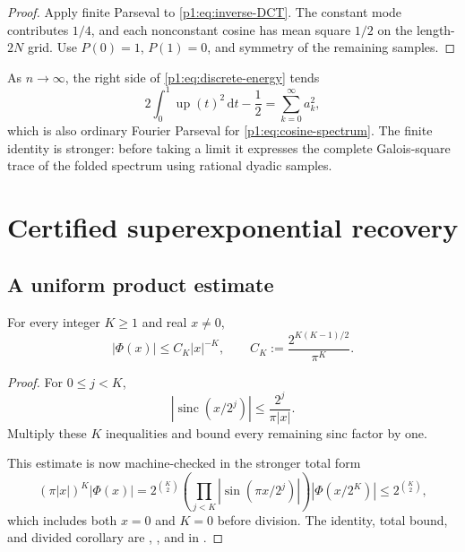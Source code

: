 \documentclass[11pt,oneside]{article}
\theoremstyle{definition}
\theoremstyle{remark}
\newcommand{\Up}{\operatorname{up}}
\newcommand{\sinc}{\operatorname{sinc}}
\newcommand{\dd}{\,\mathrm d}
\newcommand{\PhiU}{\Phi}
\begin{document}
\begin{proof}
Apply finite Parseval to \eqref{p1:eq:inverse-DCT}.  The constant mode contributes
$1/4$, and each nonconstant cosine has mean square $1/2$ on the length-$2N$
grid.  Use $P(0)=1$, $P(1)=0$, and symmetry of the remaining samples.
\end{proof}

\begin{remark}
As $n\to\infty$, the right side of \eqref{p1:eq:discrete-energy} tends
\[
 2\int_0^1\Up(t)^2\dd t-\frac12
 =\sum_{k=0}^{\infty}a_k^2,
\]
which is also ordinary Fourier Parseval for \eqref{p1:eq:cosine-spectrum}.  The
finite identity is stronger: before taking a limit it expresses the complete
Galois-square trace of the folded spectrum using rational dyadic samples.
\end{remark}

\section{Certified superexponential recovery}\label{p1:sec:alias-error}

\subsection{A uniform product estimate}

\begin{lemma}\label{p1:lem:selected-factor-bound}
For every integer $K\ge1$ and real $x\ne0$,
\begin{equation}\label{p1:eq:selected-factor-bound}
 |\PhiU(x)|\le C_K|x|^{-K},
 \qquad
 C_K:=\frac{2^{K(K-1)/2}}{\pi^K}.
\end{equation}
\end{lemma}

\begin{proof}
For $0\le j<K$,
\[
 \left|\sinc(x/2^j)\right|
 \le\frac{2^j}{\pi|x|}.
\]
Multiply these $K$ inequalities and bound every remaining sinc factor by one.

\smallskip\noindent
This estimate is now machine-checked in the stronger total form
\[
 (\pi|x|)^K|\PhiU(x)|
 =2^{\binom K2}
  \left(\prod_{j<K}\left|\sin(\pi x/2^j)\right|\right)
  |\PhiU(x/2^K)|
 \le 2^{\binom K2},
\]
which includes both $x=0$ and $K=0$ before division.  The identity, total
bound, and divided corollary are
,
, and
 in
.
\end{proof}
\end{document}
